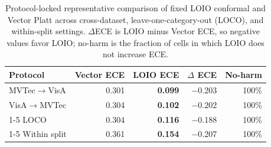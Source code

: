 \begin{table}[pos=t]
\centering
\caption{Protocol-locked representative comparison of fixed LOIO conformal and Vector Platt across cross-dataset, leave-one-category-out (LOCO), and within-split settings. $\Delta$ECE is LOIO minus Vector ECE, so negative values favor LOIO; no-harm is the fraction of cells in which LOIO does not increase ECE.}
\label{tab:protocol-routing}
\footnotesize
\begin{tabular}{lrrrr}
\toprule
Protocol & Vector ECE & LOIO ECE & $\Delta$ ECE & No-harm \\
\midrule
MVTec$\rightarrow$VisA & 0.301 & \textbf{0.099} & $-$0.203 & 100\% \\
VisA$\rightarrow$MVTec & 0.304 & \textbf{0.102} & $-$0.202 & 100\% \\
\cmidrule(lr){1-5}
LOCO & 0.304 & \textbf{0.116} & $-$0.188 & 100\% \\
\cmidrule(lr){1-5}
Within split & 0.361 & \textbf{0.154} & $-$0.207 & 100\% \\
\bottomrule
\end{tabular}
\end{table}
